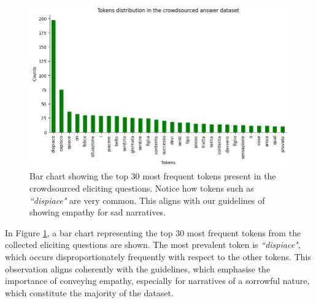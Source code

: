 \begin{figure}[!htbp]
    \centering
    \includegraphics[width=1\linewidth]{assets//imgs/dataset-top-30-answers.png}
    \caption{Bar chart showing the top 30 most frequent tokens present in the crowdsourced eliciting questions. Notice how tokens such as \emph{``dispiace"} are very common. This aligns with our guidelines of showing empathy for sad narratives. }
    \label{fig:dataset-top-30-answers}
\end{figure}

In Figure \ref{fig:dataset-top-30-answers}, a bar chart representing the top 30 most frequent tokens from the collected eliciting questions are shown. The most prevalent token is \emph{``dispiace"}, which occurs disproportionately frequently with respect to the other tokens. This observation aligns coherently with the guidelines, which emphasise the importance of conveying empathy, especially for narratives of a sorrowful nature, which constitute the majority of the dataset.

